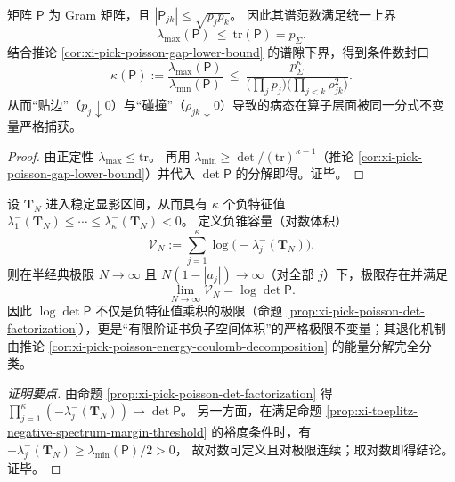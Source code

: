 \begin{corollary}\label{cor:xi-pick-poisson-condition-number-certificate}
矩阵 \(\mathsf P\) 为 Gram 矩阵，且 \(|\mathsf P_{jk}|\le \sqrt{p_jp_k}\)。
因此其谱范数满足统一上界
\[
\boxed{\;
\lambda_{\max}(\mathsf P)\ \le\ \mathrm{tr}(\mathsf P)=p_\Sigma.\;}
\]
结合推论 \ref{cor:xi-pick-poisson-gap-lower-bound} 的谱隙下界，得到条件数封口
\[
\boxed{\;
\kappa(\mathsf P):=\frac{\lambda_{\max}(\mathsf P)}{\lambda_{\min}(\mathsf P)}
\ \le\
\frac{p_\Sigma^{\kappa}}{\bigl(\prod_{j}p_j\bigr)\bigl(\prod_{j<k}\rho_{jk}^2\bigr)}.\;}
\]
从而“贴边”（\(p_j\downarrow 0\)）与“碰撞”（\(\rho_{jk}\downarrow 0\)）导致的病态在算子层面被同一分式不变量严格捕获。
\end{corollary}
\begin{proof}
由正定性 \(\lambda_{\max}\le \mathrm{tr}\)。
再用 \(\lambda_{\min}\ge \det/(\mathrm{tr})^{\kappa-1}\)（推论 \ref{cor:xi-pick-poisson-gap-lower-bound}）并代入 \(\det\mathsf P\) 的分解即得。证毕。
\end{proof}

\begin{corollary}\label{cor:xi-toeplitz-negative-log-volume-limit}
设 \(\mathbf{T}_N\) 进入稳定显影区间，从而具有 \(\kappa\) 个负特征值
\(\lambda_1^{-}(\mathbf{T}_N)\le\cdots\le\lambda_{\kappa}^{-}(\mathbf{T}_N)<0\)。
定义负锥容量（对数体积）
\[
\mathcal{V}_N:=\sum_{j=1}^{\kappa}\log\bigl(-\lambda_j^{-}(\mathbf{T}_N)\bigr).
\]
则在半经典极限 \(N\to\infty\) 且 \(N(1-|a_j|)\to\infty\)（对全部 \(j\)）下，极限存在并满足
\[
\boxed{\;
\lim_{N\to\infty}\mathcal{V}_N=\log\det\mathsf P.\;}
\]
因此 \(\log\det\mathsf P\) 不仅是负特征值乘积的极限（命题 \ref{prop:xi-pick-poisson-det-factorization}），更是“有限阶证书负子空间体积”的严格极限不变量；其退化机制由推论 \ref{cor:xi-pick-poisson-energy-coulomb-decomposition} 的能量分解完全分类。
\end{corollary}
\begin{proof}[证明要点]
由命题 \ref{prop:xi-pick-poisson-det-factorization} 得
\(
\prod_{j=1}^{\kappa}(-\lambda_j^{-}(\mathbf{T}_N))\to \det\mathsf P
\)。
另一方面，在满足命题 \ref{prop:xi-toeplitz-negative-spectrum-margin-threshold} 的裕度条件时，有
\(-\lambda_j^{-}(\mathbf{T}_N)\ge \lambda_{\min}(\mathsf P)/2>0\)，
故对数可定义且对极限连续；取对数即得结论。证毕。
\end{proof}

